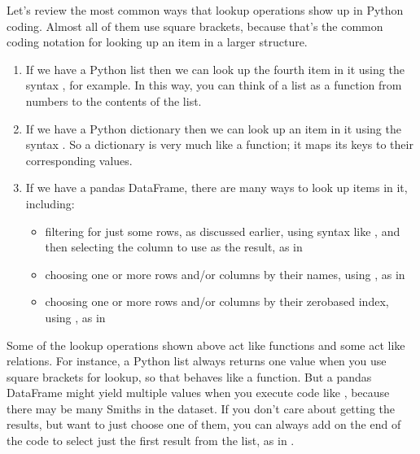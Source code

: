 \documentclass[letterpaper,10pt,english]{sphinxmanual}
\begin{document}
Let’s review the most common ways that lookup operations show up in Python coding.  Almost all of them use square brackets, because that’s the common coding notation for looking up an item in a larger structure.
\begin{enumerate}
%
\item {} 
If we have a Python list  then we can look up the fourth item in it using the syntax , for example.  In this way, you can think of a list as a function from numbers to the contents of the list.

\item {} 
If we have a Python dictionary  then we can look up an item in it using the syntax .  So a dictionary is very much like a function; it maps its keys to their corresponding values.

\item {} 
If we have a pandas DataFrame, there are many ways to look up items in it, including:
\begin{itemize}
\item {} 
filtering for just some rows, as discussed earlier, using syntax like , and then selecting the column to use as the result, as in 

\item {} 
choosing one or more rows and/or columns by their names, using , as in 

\item {} 
choosing one or more rows and/or columns by their zero\sphinxhyphen{}based index, using , as in 

\end{itemize}

\end{enumerate}

Some of the lookup operations shown above act like functions and some act like relations.  For instance, a Python list always returns one value when you use square brackets for lookup, so that behaves like a function.  But a pandas DataFrame might yield multiple values when you execute code like , because there may be many Smiths in the dataset.  If you don’t care about getting  the results, but want to just choose one of them, you can always add  on the end of the code to select just the first result from the list, as in .
\end{document}
